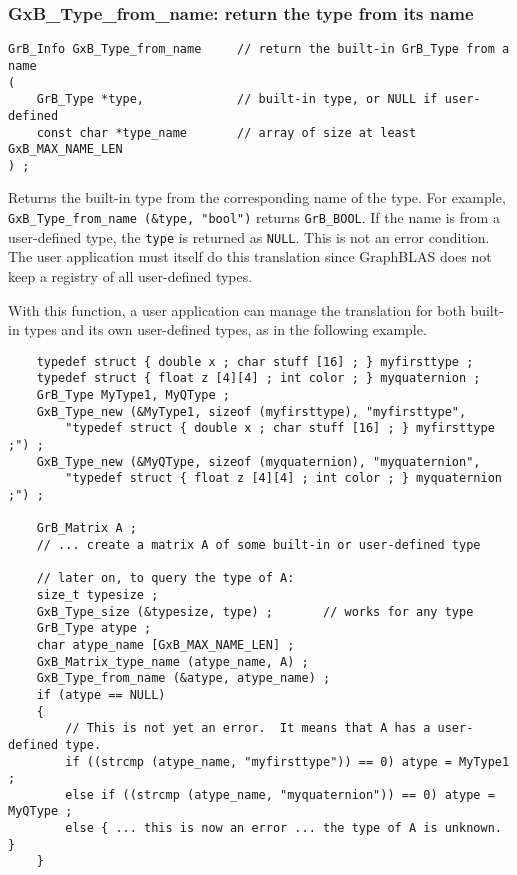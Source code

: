 \documentclass[12pt]{article}
\begin{document}
\newpage
\subsubsection{{\sf GxB\_Type\_from\_name:} return the type from its name}
\label{type_from_name}

\begin{mdframed}[userdefinedwidth=6in]
{\footnotesize
\begin{verbatim}
GrB_Info GxB_Type_from_name     // return the built-in GrB_Type from a name
(
    GrB_Type *type,             // built-in type, or NULL if user-defined
    const char *type_name       // array of size at least GxB_MAX_NAME_LEN
) ;
\end{verbatim}
}\end{mdframed}

Returns the built-in type from the corresponding name of the type.  For
example, \verb'GxB_Type_from_name (&type, "bool")' returns \verb'GrB_BOOL'.  If
the name is from a user-defined type, the \verb'type' is returned as
\verb'NULL'.  This is not an error condition.  The user application must itself
do this translation since GraphBLAS does not keep a registry of all
user-defined types.

With this function, a user application can manage the translation for
both built-in types and its own user-defined types, as in the following
example.

{\footnotesize
\begin{verbatim}
    typedef struct { double x ; char stuff [16] ; } myfirsttype ;
    typedef struct { float z [4][4] ; int color ; } myquaternion ;
    GrB_Type MyType1, MyQType ;
    GxB_Type_new (&MyType1, sizeof (myfirsttype), "myfirsttype",
        "typedef struct { double x ; char stuff [16] ; } myfirsttype ;") ;
    GxB_Type_new (&MyQType, sizeof (myquaternion), "myquaternion",
        "typedef struct { float z [4][4] ; int color ; } myquaternion ;") ;

    GrB_Matrix A ;
    // ... create a matrix A of some built-in or user-defined type

    // later on, to query the type of A:
    size_t typesize ;
    GxB_Type_size (&typesize, type) ;       // works for any type
    GrB_Type atype ;
    char atype_name [GxB_MAX_NAME_LEN] ;
    GxB_Matrix_type_name (atype_name, A) ;
    GxB_Type_from_name (&atype, atype_name) ;
    if (atype == NULL)
    {
        // This is not yet an error.  It means that A has a user-defined type.
        if ((strcmp (atype_name, "myfirsttype")) == 0) atype = MyType1 ;
        else if ((strcmp (atype_name, "myquaternion")) == 0) atype = MyQType ;
        else { ... this is now an error ... the type of A is unknown.  }
    }\end{verbatim} }
\end{document}
